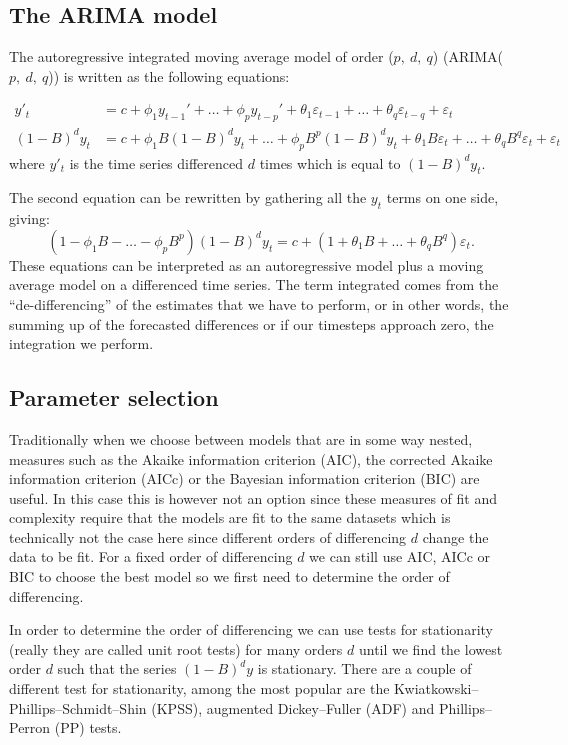 \documentclass[a4paper, 12pt]{scrartcl}
\begin{document}
\subsection{The ARIMA model}
The autoregressive integrated moving average model of order ($p,~d,~q$) (ARIMA($p,~d,~q$)) is written as the following equations:

\begin{align*}
	y'_t&=c+\phi_1y_{t-1}'+\dots+\phi_py_{t-p}'+\theta_1\varepsilon_{t-1}+\dots+\theta_q\varepsilon_{t-q}+\varepsilon_t\\
	(1-B)^dy_{t}&=c+\phi_1B(1-B)^dy_{t}+\dots+\phi_pB^p(1-B)^dy_t+\theta_1B\varepsilon_t+\dots+\theta_qB^q\varepsilon_{t}+\varepsilon_t
\end{align*}
where $y'_t$ is the time series differenced $d$ times which is equal to $(1-B)^dy_{t}$.

The second equation can be rewritten by gathering all the $y_t$ terms on one side, giving:
\begin{equation*}
	\left(1-\phi_1B-\dots-\phi_pB^p\right)\left(1-B\right)^dy_t=c+\left(1+\theta_1B+\dots+\theta_qB^q\right)\varepsilon_{t}.
\end{equation*}
These equations can be interpreted as an autoregressive model plus a moving average model on a differenced time series.
The term integrated comes from the ``de-differencing'' of the estimates that we have to perform, or in other words, the summing up of the forecasted differences or if our timesteps approach zero, the integration we perform.

\subsection{Parameter selection}

Traditionally when we choose between models that are in some way nested, measures such as the Akaike information criterion (AIC), the corrected Akaike information criterion (AICc) or the Bayesian information criterion (BIC) are useful.
In this case this is however not an option since these measures of fit and complexity require that the models are fit to the same datasets which is technically not the case here since different orders of differencing $d$ change the data to be fit.
For a fixed order of differencing $d$ we can still use AIC, AICc or BIC to choose the best model so we first need to determine the order of differencing.

In order to determine the order of differencing we can use tests for stationarity (really they are called unit root tests) for many orders $d$ until we find the lowest order $d$ such that the series $(1-B)^dy$ is stationary.
There are a couple of different test for stationarity, among the most popular are the Kwiatkowski–Phillips–Schmidt–Shin (KPSS), augmented Dickey–Fuller (ADF) and Phillips–Perron (PP) tests.
\end{document}
